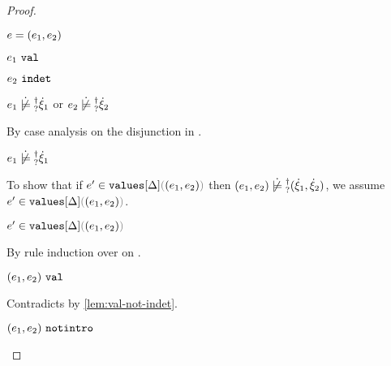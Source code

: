 \begin{proof}
\begin{byCases}
\begin{byCases}
\begin{byCases}
\begin{byCases}
        \end{byCases}
        \item[\text{(\ref{rule:IPairR})}] 
        \begin{pfsteps*}
        \item $e=(e_1 , e_2)$ 
        \item $e_1 ~\mathtt{val}$  
        \item $e_2 ~\mathtt{indet}$  
        \item $\cnotsatisfyormay{e_1}{\hxi_1}$ or $\cnotsatisfyormay{e_2}{\hxi_2}$  
        \end{pfsteps*}
        By case analysis on the disjunction in .
        \begin{byCases}
          \item[\cnotsatisfyormay{e_1}{\hxi_1}]
          \begin{pfsteps*}
          \item $\cnotsatisfyormay{e_1}{\hxi_1}$  
          \end{pfsteps*}
          To show that if $\inValues{e'}{\Delta}{\hpair{e_1}{e_2}}$ then $\cnotsatisfyormay{\hpair{e_1}{e_2}}{\cpair{\hxi_1}{\hxi_2}}$, we assume $\inValues{e'}{\Delta}{\hpair{e_1}{e_2}}$.
          \begin{pfsteps*}
          \item $\inValues{e'}{\Delta}{\hpair{e_1}{e_2}}$  
          \end{pfsteps*}
          By rule induction over  on .
          \begin{byCases}
            \item[\text{(\ref{rule:IVVal})}]
            \begin{pfsteps*}
            \item $(e_1 , e_2) ~\mathtt{val}$ 
            \end{pfsteps*} 
            Contradicts  by \autoref{lem:val-not-indet}.
            \item[\text{(\ref{rule:IVIndet})}] 
            \begin{pfsteps*}
            \item $(e_1 , e_2) ~\mathtt{notintro}$ 

\end{pfsteps*}
\end{byCases}
\end{byCases}
\end{byCases}
\end{byCases}
\end{byCases}
\end{proof}
